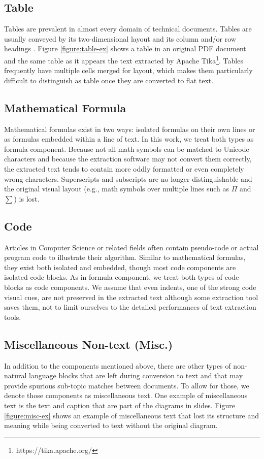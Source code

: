 \documentclass[11pt,letterpaper]{article}
\begin{document}
\subsection{Table}
Tables are prevalent in almost every domain of technical documents. Tables are usually conveyed by its two-dimensional layout and its column and/or row headings \cite{tablesurvey}. Figure \ref{figure:table-ex} shows a table in an original PDF document and the same table as it appears the text extracted by Apache Tika\footnote{https://tika.apache.org/}. Tables frequently have multiple cells merged for layout, which makes them particularly difficult to distinguish as table once they are converted to flat text.  

\subsection{Mathematical Formula}
Mathematical formulas exist in two ways: isolated formulas on their own lines or as formulas embedded within a line of text. In this work, we treat both types as formula component. Because not all math symbols can be matched to Unicode characters and because the extraction software may not convert them correctly, the extracted text tends to contain more oddly formatted or even completely wrong characters. Superscripts and subscripts are no longer distinguishable and the original visual layout (e.g., math symbols over multiple lines such as $\Pi$ and $\sum$) is lost. 

\subsection{Code}
Articles in Computer Science or related fields often contain pseudo-code or actual program code to illustrate their algorithm. Similar to mathematical formulas, they exist both isolated and embedded, though most code components are isolated code blocks. As in formula component, we treat both types of code blocks as code components. We assume that even indents, one of the strong code visual cues, are not preserved in the extracted text although some extraction tool saves them, not to limit ourselves to the detailed performances of text extraction tools.

\subsection{Miscellaneous Non-text (Misc.)}
In addition to the components mentioned above, there are other types of non-natural language blocks that are left during conversion to text and that may provide spurious sub-topic matches between documents. To allow for those, we denote those components as miscellaneous text. One example of miscellaneous text is the text and caption that are part of the diagrams in slides. Figure \ref{figure:misc-ex} shows an example of miscellaneous text that lost its structure and meaning while being converted to text without the original diagram.  
\end{document}

